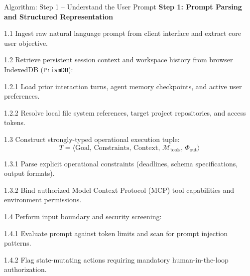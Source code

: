 \documentclass[aspectratio=169,10pt]{beamer}
\newenvironment{algolist}{%
  \begin{list}{}{%
    \setlength{\labelwidth}{1.8em}%
    \setlength{\leftmargin}{2.0em}%
    \setlength{\itemindent}{0pt}%
    \setlength{\labelsep}{0.45em}%
    \setlength{\itemsep}{0.28em}%
    \setlength{\parsep}{0pt}%
    \setlength{\topsep}{0.1em}%
    \renewcommand{\makelabel}[1]{\textbf{\color{lavenderDark}##1}}%
  }\small%
}{\end{list}}
\newenvironment{algosublist}{%
  \begin{list}{}{%
    \setlength{\labelwidth}{2.4em}%
    \setlength{\leftmargin}{2.8em}%
    \setlength{\itemindent}{0pt}%
    \setlength{\labelsep}{0.4em}%
    \setlength{\itemsep}{0.14em}%
    \setlength{\parsep}{0pt}%
    \setlength{\topsep}{0.1em}%
    \renewcommand{\makelabel}[1]{\textbf{\color{lavenderMedium}##1}}%
  }\small%
}{\end{list}}
\begin{document}
\begin{frame}[t]{Algorithm: Step 1 -- Understand the User Prompt}
\vspace{-0.15em}
{\large\bfseries\color{lavenderDark}Step 1: Prompt Parsing and Structured Representation}
\vspace{0.15em}

\begin{algolist}
  \item[1.1] Ingest raw natural language prompt from client interface and extract core user objective.
  \item[1.2] Retrieve persistent session context and workspace history from browser IndexedDB (\texttt{PrismDB}):
    \begin{algosublist}
      \item[1.2.1] Load prior interaction turns, agent memory checkpoints, and active user preferences.
      \item[1.2.2] Resolve local file system references, target project repositories, and access tokens.
    \end{algosublist}
  \item[1.3] Construct strongly-typed operational execution tuple:
    \vspace{-0.2em}
    $$T = \langle \text{Goal}, \, \text{Constraints}, \, \text{Context}, \, \mathcal{M}_{\text{tools}}, \, \Phi_{\text{out}} \rangle$$
    \vspace{-0.2em}
    \begin{algosublist}
      \item[1.3.1] Parse explicit operational constraints (deadlines, schema specifications, output formats).
      \item[1.3.2] Bind authorized Model Context Protocol (MCP) tool capabilities and environment permissions.
    \end{algosublist}
  \item[1.4] Perform input boundary and security screening:
    \begin{algosublist}
      \item[1.4.1] Evaluate prompt against token limits and scan for prompt injection patterns.
      \item[1.4.2] Flag state-mutating actions requiring mandatory human-in-the-loop authorization.
    \end{algosublist}
\end{algolist}
\end{frame}
\end{document}
